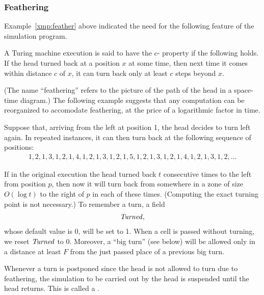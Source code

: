 \documentclass[11pt]{memoir}
\theoremstyle{definition} %
\newcommand{\fld}[1]{\ensuremath{\textit{#1\/}}}
\newcommand{\F}{F}
\newcommand{\Turned}{\fld{Turned}} %
\begin{document}
\subsubsection{Feathering}\label{sec:feathering}

Example~\ref{xmp:feather} above indicated the need for the
following feature of the simulation program.

\begin{definition}[Feathering]\label{def:feathering}
A Turing machine execution is said to have the \( c \)- property if the following holds.
If the head turned back at a position \( x \) at some time, then next time it comes within distance \( c \)
of \( x \), it can turn back only at least \( c \) steps beyond \( x \).
\end{definition}

(The name ``feathering'' refers to the picture of the path of the head in a space-time diagram.)
The following example suggests that any computation can be reorganized to accomodate feathering,
at the price of a logarithmic factor in time.

\begin{example}[1-feathering]\label{xmp:feathering}
Suppose that, arriving from the left at position 1, the head decides to turn left again.
In repeated instances, it can then turn back at the following sequence of positions:
\begin{align*}
 1, 2, 1, 3, 1, 2, 1, 4, 1, 2, 1, 3, 1, 2, 1, 5, 1, 2, 1, 3, 1, 2, 1, 4, 1, 2, 1, 3, 1, 2, \dots
 \end{align*}
\end{example}

If in the original execution the head turned back \( t \) consecutive
times to the left from position \( p \), then now it will 
turn back from somewhere in a zone of size \( O(\log t) \) to the right of \( p \) in 
each of these times.
(Computing the exact turning point is not necessary.)
To remember a turn, a field
\begin{align*}
 \Turned,
\end{align*}
whose default value is 0, will be set to 1.
When a cell is passed without turning, we reset \( \Turned \) to 0.
Moreover, a ``big turn'' (see below)
will be allowed only in a distance at least \( \F \) from the just passed place of a previous
big turn.

\begin{definition}[Digression]\label{def:digression}
Whenever a turn is postponed since the head is not allowed to turn due to feathering,
the simulation to be carried out by the head is suspended until the head returns.
This is called a .
\end{definition}
\end{document}
